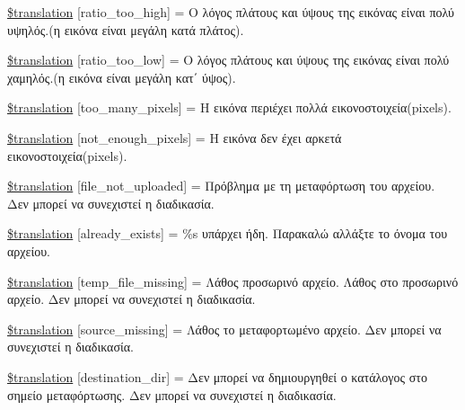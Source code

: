 \begin{DoxyCompactItemize}
\hyperlink{class_8upload_8el___g_r_8php_a23396f6ce7f31e5e5f1b57580621d982}{\$translation} \mbox{[}\textquotesingle{}ratio\+\_\+too\+\_\+high\textquotesingle{}\mbox{]} = \textquotesingle{}Ο λόγος πλάτους και ύψους της εικόνας είναι πολύ υψηλός.(η εικόνα είναι μεγάλη κατά πλάτος).\textquotesingle{}
\item 
\hyperlink{class_8upload_8el___g_r_8php_ac533b9a479f056b0b8623e4268f068c2}{\$translation} \mbox{[}\textquotesingle{}ratio\+\_\+too\+\_\+low\textquotesingle{}\mbox{]} = \textquotesingle{}Ο λόγος πλάτους και ύψους της εικόνας είναι πολύ χαμηλός.(η εικόνα είναι μεγάλη κατ΄ ύψος).\textquotesingle{}
\item 
\hyperlink{class_8upload_8el___g_r_8php_aa4051ef64e94a3f8295c63cf85544016}{\$translation} \mbox{[}\textquotesingle{}too\+\_\+many\+\_\+pixels\textquotesingle{}\mbox{]} = \textquotesingle{}Η εικόνα περιέχει πολλά εικονοστοιχεία(pixels).\textquotesingle{}
\item 
\hyperlink{class_8upload_8el___g_r_8php_a1fe342c27ce61f4ff4e0120ba647033e}{\$translation} \mbox{[}\textquotesingle{}not\+\_\+enough\+\_\+pixels\textquotesingle{}\mbox{]} = \textquotesingle{}Η εικόνα δεν έχει αρκετά εικονοστοιχεία(pixels).\textquotesingle{}
\item 
\hyperlink{class_8upload_8el___g_r_8php_a4ce76e7be0b3a03c2b47f6d70c21832e}{\$translation} \mbox{[}\textquotesingle{}file\+\_\+not\+\_\+uploaded\textquotesingle{}\mbox{]} = \textquotesingle{}Πρόβλημα με τη μεταφόρτωση του αρχείου. Δεν μπορεί να συνεχιστεί η διαδικασία.\textquotesingle{}
\item 
\hyperlink{class_8upload_8el___g_r_8php_afd84e910217f04139f567c41e292afa5}{\$translation} \mbox{[}\textquotesingle{}already\+\_\+exists\textquotesingle{}\mbox{]} = \textquotesingle{}\%s υπάρχει ήδη. Παρακαλώ αλλάξτε το όνομα του αρχείου.\textquotesingle{}
\item 
\hyperlink{class_8upload_8el___g_r_8php_ab0fa87a88aba2624004581eed0633325}{\$translation} \mbox{[}\textquotesingle{}temp\+\_\+file\+\_\+missing\textquotesingle{}\mbox{]} = \textquotesingle{}Λάθος προσωρινό αρχείο. Λάθος στο προσωρινό αρχείο. Δεν μπορεί να συνεχιστεί η διαδικασία.\textquotesingle{}
\item 
\hyperlink{class_8upload_8el___g_r_8php_aceaaf7355acaaf10f0ae60378d03c468}{\$translation} \mbox{[}\textquotesingle{}source\+\_\+missing\textquotesingle{}\mbox{]} = \textquotesingle{}Λάθος το μεταφορτωμένο αρχείο. Δεν μπορεί να συνεχιστεί η διαδικασία.\textquotesingle{}
\item 
\hyperlink{class_8upload_8el___g_r_8php_aff2427c72a2598aefa6d58df1dd18b08}{\$translation} \mbox{[}\textquotesingle{}destination\+\_\+dir\textquotesingle{}\mbox{]} = \textquotesingle{}Δεν μπορεί να δημιουργηθεί ο κατάλογος στο σημείο μεταφόρτωσης. Δεν μπορεί να συνεχιστεί η διαδικασία.\textquotesingle{}

\end{DoxyCompactItemize}

